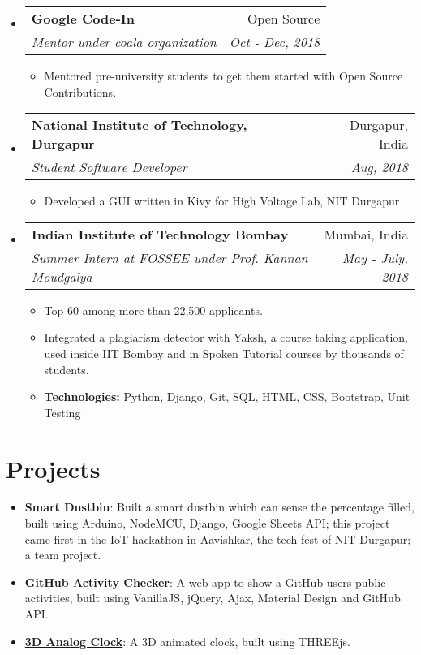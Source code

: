 \documentclass[a4paper,11pt]{article}
\makeatletter
\newcommand{\resumeSubheading}[4]{
  \vspace{-1pt}\item
    \begin{tabular*}{0.97\textwidth}[t]{l@{\extracolsep{\fill}}r}
      \textbf{#1 } & #2 \\
      \textit{\small#3} & \textit{\small #4} \\
    \end{tabular*}\vspace{-5pt}
}
\newcommand{\resumeSubHeadingListStart}{\begin{itemize}[leftmargin=*, topsep=0pt]}
\newcommand{\resumeSubHeadingListEnd}{\end{itemize}}
\newcommand{\resumeItemListStart}{\begin{itemize}}
\newcommand{\resumeItemListEnd}{\end{itemize}\vspace{-5pt}}
\makeatother
\begin{document}
    \resumeSubHeadingListStart
      \resumeSubheading
        {Google Code-In}{Open Source}
        {Mentor under coala organization}{Oct - Dec, 2018}
        \resumeItemListStart
          \item\small
          {Mentored pre-university students to get them started with Open Source Contributions.} %
        \resumeItemListEnd
    \resumeSubHeadingListEnd
    
    \resumeSubHeadingListStart
      \resumeSubheading
      {National Institute of Technology, Durgapur}{Durgapur, India}
      {Student Software Developer}{Aug, 2018}
      \resumeItemListStart
        \item\small
        {Developed a GUI written in Kivy for High Voltage Lab, NIT Durgapur}
        \resumeItemListEnd
    \resumeSubHeadingListEnd
    
  \resumeSubHeadingListStart
    \resumeSubheading
    {Indian Institute of Technology Bombay}{Mumbai, India}
    {Summer Intern at FOSSEE under Prof. Kannan Moudgalya}{May - July, 2018}
    \resumeItemListStart
      \item\small
        {Top 60 among more than 22,500 applicants.}
      \item\small
        {Integrated a plagiarism detector with Yaksh, a course taking application, used inside IIT Bombay and in Spoken Tutorial courses by thousands of students.}
      \item\small
      {\textbf{Technologies:} Python, Django, Git, SQL, HTML, CSS, Bootstrap, Unit Testing}
    \resumeItemListEnd
  \resumeSubHeadingListEnd
  
\section{Projects}
      \setlength{\itemsep}{0.5pt}
      \begin{itemize}
        \item\textbf{Smart Dustbin}{: Built a smart dustbin which can sense the percentage filled, built using Arduino, NodeMCU, Django, Google Sheets API; this project came first in the IoT hackathon in Aavishkar, the tech
        fest of NIT Durgapur; a team project.}
        \item\textbf{\href{https://github.com/ayan-b/GitHub-Activity-Checker}{GitHub Activity Checker}}{: A web app to show a GitHub user\textsc{}s public activities, built using VanillaJS, jQuery, Ajax, Material Design and GitHub API.}
        \item\textbf{\href{https://github.com/ayan-b/Analog-Clock-Reading}{3D Analog Clock}}{: A 3D animated clock, built using THREEjs.}
      \end{itemize}
  
\end{document}
